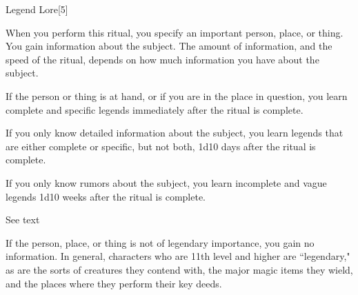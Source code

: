 \begin{spellsection}{Legend Lore}[5]
    \begin{spellheader}
    \end{spellheader}
    \begin{spellcontent}
        \begin{spelltargetinginfo}
        \end{spelltargetinginfo}
        \begin{spelleffects}

            \spelleffect When you perform this ritual, you specify an important person, place, or thing. You gain information about the subject. The amount of information, and the speed of the ritual, depends on how much information you have about the subject.

            If the person or thing is at hand, or if you are in the place in question, you learn complete and specific legends immediately after the ritual is complete.

            If you only know detailed information about the subject, you learn legends that are either complete or specific, but not both, 1d10 days after the ritual is complete.

            If you only know rumors about the subject, you learn incomplete and vague legends 1d10 weeks after the ritual is complete.

            \spelldur See text
        \end{spelleffects}
    \end{spellcontent}
    \begin{spellfooter}
        \spellnotes If the person, place, or thing is not of legendary importance, you gain no information. In general, characters who are 11th level and higher are ``legendary," as are the sorts of creatures they contend with, the major magic items they wield, and the places where they perform their key deeds.
    \end{spellfooter}
\end{spellsection}

